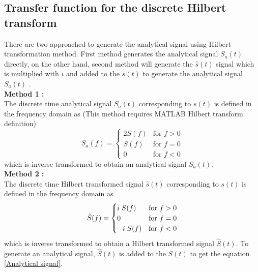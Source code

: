 \begin{refsection}
\subsection*{Transfer function for the discrete Hilbert transform}
There are two approached to generate the analytical signal using Hilbert transformation method. First method generates the analytical signal $S_a(t)$ directly, on the other hand, second method will generate the $\hat{s}(t)$ signal which is multiplied with $i$ and added to the ${s}(t)$ to generate the analytical signal $S_a(t)$ .\\
\textbf{Method 1 :}\\
The discrete time analytical signal $S_a(t)$ corresponding to  ${s}(t)$ is defined in the frequency domain as \cite{Marple} (This method requires MATLAB Hilbert transform definition)
\begin{equation}
S_a(f) = \begin{cases}
2S(f) &\text{for $f>0$}\\ 
S(f) &\text{for $f=0$}\\ 
0 &\text{for $f<0$}
\end{cases}
\end{equation}
which is inverse transformed to obtain an analytical signal $S_a(t)$.\\
\textbf{Method 2 :}\\
The discrete time Hilbert transformed signal  $\hat{s}(t)$ corresponding to  ${s}(t)$ is defined in the frequency domain as \cite{Oppenheim1999}
\begin{equation}
 \hat{S}(f)= \begin{cases}
i\hspace{1mm} S(f) &\text{for $f>0$}\\ 
0 &\text{for $f=0$}\\ 
-i\hspace{1mm} S(f) &\text{for $f<0$}
\end{cases}
\end{equation}
which is inverse transformed to obtain a Hilbert transformed signal $\hat{S}(t)$. To generate an analytical signal,  $\hat{S}(t)$ is added to the $S(t)$ to get the equation \ref{Analytical signal}.\\

\end{refsection}
